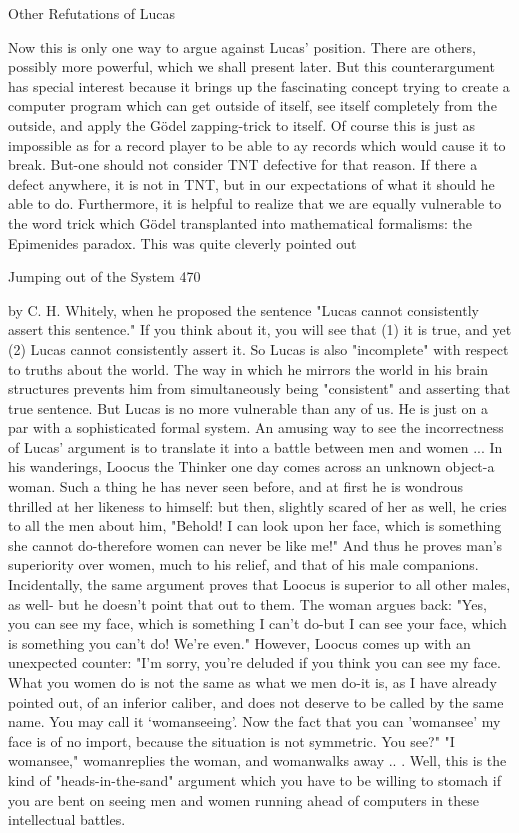 {                                 Other Refutations of Lucas

Now this is only one way to argue against Lucas' position. There are others, possibly
more powerful, which we shall present later. But this counterargument has special
interest because it brings up the fascinating concept trying to create a computer program
which can get outside of itself, see itself completely from the outside, and apply the
Gödel zapping-trick to itself. Of course this is just as impossible as for a record player to
be able to ay records which would cause it to break.
But-one should not consider TNT defective for that reason. If there a defect anywhere, it
is not in TNT, but in our expectations of what it should he able to do. Furthermore, it is
helpful to realize that we are equally vulnerable to the word trick which Gödel
transplanted into mathematical formalisms: the Epimenides paradox. This was quite
cleverly pointed out




Jumping out of the System                                                                     470

by C. H. Whitely, when he proposed the sentence "Lucas cannot consistently assert this
sentence." If you think about it, you will see that (1) it is true, and yet (2) Lucas cannot
consistently assert it. So Lucas is also "incomplete" with respect to truths about the
world. The way in which he mirrors the world in his brain structures prevents him from
simultaneously being "consistent" and asserting that true sentence. But Lucas is no more
vulnerable than any of us. He is just on a par with a sophisticated formal system.
        An amusing way to see the incorrectness of Lucas' argument is to translate it into
a battle between men and women ... In his wanderings, Loocus the Thinker one day
comes across an unknown object-a woman. Such a thing he has never seen before, and at
first he is wondrous thrilled at her likeness to himself: but then, slightly scared of her as
well, he cries to all the men about him, "Behold! I can look upon her face, which is
something she cannot do-therefore women can never be like me!" And thus he proves
man's superiority over women, much to his relief, and that of his male companions.
Incidentally, the same argument proves that Loocus is superior to all other males, as well-
but he doesn't point that out to them. The woman argues back: "Yes, you can see my face,
which is something I can't do-but I can see your face, which is something you can't do!
We're even." However, Loocus comes up with an unexpected counter: "I'm sorry, you're
deluded if you think you can see my face. What you women do is not the same as what
we men do-it is, as I have already pointed out, of an inferior caliber, and does not deserve
to be called by the same name. You may call it `womanseeing'. Now the fact that you can
'womansee' my face is of no import, because the situation is not symmetric. You see?" "I
womansee," womanreplies the woman, and womanwalks away .. .
        Well, this is the kind of "heads-in-the-sand" argument which you have to be
willing to stomach if you are bent on seeing men and women running ahead of computers
in these intellectual battles.

}

